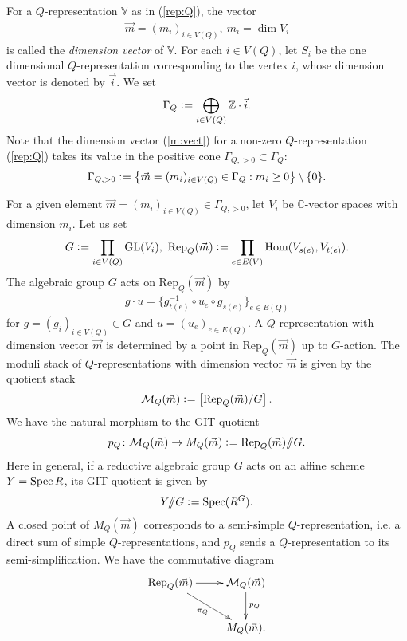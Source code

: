 \documentclass[11pt]{amsart}
\theoremstyle{plain}
\theoremstyle{definition}
\theoremstyle{remark}
\newcommand{\sslash}{/\!\!/}
\newcommand{\mM}{\mathcal{M}}
\newcommand{\Hom}{\mathop{\rm Hom}\nolimits}
\newcommand{\Spec}{\mathop{\rm Spec}\nolimits}
\newcommand{\GL}{\mathop{\rm GL}\nolimits}
\begin{document}
For a $Q$-representation $\mathbb{V}$ as in (\ref{rep:Q}), the vector
\begin{align}\label{m:vect}
\vec{m}=(m_i)_{i \in V(Q)}, \ 
m_i=\dim V_i
\end{align}
is called the \textit{dimension vector} of $\mathbb{V}$. 
For each $i \in V(Q)$, let 
$S_i$ be the one dimensional
 $Q$-representation corresponding to 
the vertex $i$, whose dimension vector is denoted by 
$\vec{i}$. 
We set
\begin{align*}
\Gamma_Q \cneq \bigoplus_{i \in V(Q)} \mathbb{Z} \cdot \vec{i}. 
\end{align*}
Note that the dimension vector (\ref{m:vect}) 
for a non-zero $Q$-representation (\ref{rep:Q}) 
takes its value in 
the positive cone $\Gamma_{Q, >0} \subset \Gamma_Q$:
\begin{align}\label{Q:positive}
\Gamma_{Q, >0} \cneq 
\left\{ \vec{m}=(m_i)_{i \in V(Q)} \in \Gamma_Q : 
m_i \ge 0\right\} \setminus \{0\}.
\end{align}
 
For a given element 
$\vec{m}=(m_i)_{i\in V(Q)} \in \Gamma_{Q, >0}$,  
let $V_i$ be $\mathbb{C}$-vector spaces with 
dimension $m_i$. 
Let us set 
\begin{align}\label{def:G}
G \cneq \prod_{i \in V(Q)} \GL(V_i), \ 
\mathrm{Rep}_Q(\vec{m}) \cneq \prod_{e \in E(V)} \Hom(V_{s(e)}, V_{t(e)}).
\end{align}
The algebraic group $G$ acts on $\mathrm{Rep}_Q(\vec{m})$ by 
\begin{align}\label{G:act}
g \cdot u=\{g_{t(e)}^{-1} \circ u_e \circ g_{s(e)}\}_{e\in E(Q)}
\end{align}
for $g=(g_i)_{i \in V(Q)} \in G$ 
and $u=(u_e)_{e\in E(Q)}$. 
A $Q$-representation with dimension vector $\vec{m}$ is 
determined by a point in $\mathrm{Rep}_Q(\vec{m})$
up to $G$-action. 
The moduli stack of $Q$-representations with 
dimension vector $\vec{m}$ is given by the 
quotient stack 
\begin{align}\label{stack:repQ}
\mM_{Q}(\vec{m}) \cneq \left[ \mathrm{Rep}_Q(\vec{m})/G \right]. 
\end{align}
We have the natural morphism to the GIT quotient
\begin{align}\label{mor:coarse}
p_Q \colon \mM_Q(\vec{m}) \to 
M_{Q}(\vec{m}) \cneq \mathrm{Rep}_Q(\vec{m}) \sslash G. 
\end{align}
Here in general, if a reductive algebraic group $G$ acts on 
an affine scheme $Y=\Spec R$, its GIT quotient is given by
\begin{align*}
Y\sslash G \cneq \Spec (R^G).
\end{align*}
A closed point of $M_{Q}(\vec{m})$ corresponds to a
semi-simple $Q$-representation, i.e. a
direct sum of simple $Q$-representations, 
and $p_Q$ sends a $Q$-representation to its 
semi-simplification. 
We have the commutative diagram
\begin{align}\label{dia:quiver}
\xymatrix{
\mathrm{Rep}_Q(\vec{m}) \ar[r] \ar[rd]_{\pi_Q} & \mM_{Q}(\vec{m}) \ar[d]^{p_Q} \\
& M_{Q}(\vec{m}). 
}
\end{align}
\end{document}
